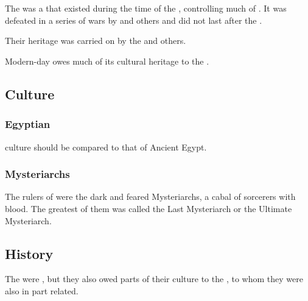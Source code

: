 \section{\Shurco}
\index{\Shurco}
\index{\Shurcarie}
The \Shurcarie{} was a \scathaese{}   that existed during the time of the , controlling much of . 
It was defeated in a series of wars by \VizicarDurasRespina{} and others and did not last after the . 

Their heritage was carried on by the \Ortaicans{} and others. 

Modern-day  owes much of its cultural heritage to the \Shurco.









\subsection{Culture}





\subsubsection{Egyptian}
\Shurco culture should be compared to that of Ancient Egypt. 





\subsubsection{Mysteriarchs}
The rulers of \Shurco were the dark and feared Mysteriarchs, a cabal of sorcerers with \ophidian blood. 
The greatest of them was called the Last Mysteriarch or the Ultimate Mysteriarch. 










\subsection{History}
The \Shurco{} were \Mekrii, but they also owed parts of their culture to the  \Masthenon, to whom they were also in part related. 















